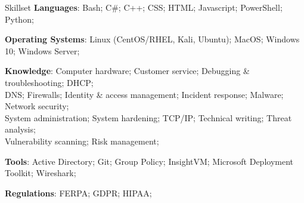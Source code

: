 \documentclass{resume} %
\begin{document}
	
	\begin{rSection}{Skillset}
		\textbf{Languages}: Bash; C\#; C++; CSS; HTML; Javascript; PowerShell; Python;
		
		\textbf{Operating Systems}: Linux (CentOS/RHEL, Kali, Ubuntu); MacOS; Windows 10; Windows Server;
		
		\textbf{Knowledge}: Computer hardware; Customer service; Debugging \& troubleshooting; DHCP;\\DNS; Firewalls; Identity \& access management; Incident response; Malware; Network security;\\System administration; System hardening; TCP/IP; Technical writing; Threat analysis;\\Vulnerability scanning; Risk management;
		
		\textbf{Tools}: Active Directory; Git; Group Policy; InsightVM; Microsoft Deployment Toolkit; Wireshark;
		
		\textbf{Regulations}: FERPA; GDPR; HIPAA;
	\end{rSection}

	
		
	
	
\end{document}
